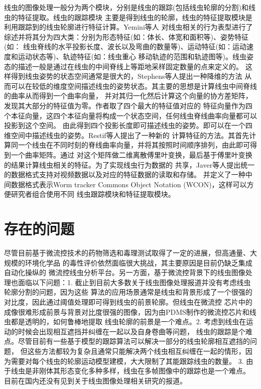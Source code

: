 	线虫的图像处理一般分为两个模块，分别是线虫的跟踪(包括线虫轮廓的分割)和线虫的特征提取。线虫的跟踪模块
	主要是得到线虫的轮廓，线虫的特征提取模块是利用跟踪到的线虫轮廓进行特征计算。Yemini等人\cite{yemini2013database}
	对线虫相关的行为表型进行了综述并将其分为四大类：分别为形态特征(如：体长、体宽和面积等)、姿势特征(如：
	线虫脊线的水平投影长度、波长以及弯曲的数量等)、运动特征(如：运动速度和运动状态等)、轨迹特征(如：线虫重心
	移动轨迹的范围和轨迹图等)。线虫姿态的描述一般是通过在线虫的中间脊线上等距地采样固定数量的点来定义的。
	这样得到线虫姿势的状态空间通常是很大的，Stephens等人\cite{Stephens2008Dimensionality}提出一种降维的方法
	从而可以在较低的维度空间描述线虫的姿势状态。其主要的思想是计算线虫中间脊线的曲率从而得到一个曲率向量，
	并对其归一化然后计算这个向量的协方差矩阵，发现其大部分的特征值为零。作者取了四个最大的特征值对应的
	特征向量作为四个本征向量，这四个本征向量将构成一个状态空间，任何线虫脊线曲率向量都可以投影到这个空间。
	由此得到四个投影长度即可描述线虫的姿势。即可以在一个四维空间中描述线虫的姿势。Restif等人\cite{Restif2014CeleST}提出了一种新的
	计算特征的方法。其首先计算同一个线虫在不同时刻的脊线曲率向量，并将其按照时间顺序排列，由此即可得到一个曲率矩阵。通过
	对这个矩阵做二维离散傅里叶变换，最后基于傅里叶变换的结果计算线虫相关的特征。为了实现线虫行为数据的
	共享，Javer等人\cite{Javer2018An}提出统一的数据格式支持对视频数据以及对应的特征数据的读取和存储。
	并定义了一种中间数据格式表示Worm tracker Commons Object Notation (WCON)，这样可以方便研究者组合使用不同
	线虫跟踪模块和特征提取模块。
\section{存在的问题}
\label{sec:intro:analog}
	 尽管目前基于微流控技术的药物筛选和毒理测试取得了一定的进展，但高通量、大规模的环境化学品
	 的毒性评价依然面临很大挑战，其主要原因是目前仍缺乏集成自动化操纵的
	 微流控线虫分析平台。另一方面，基于微流控背景下的线虫图像处理也面临以下问题：1. 截止到目前大多数关于线虫图像处理报道并没有考虑线虫轮廓分割的问题，因为这些
算法的应用场景通常是线虫和背景形成了一个很强的对比度，因此通过阈值处理即可得到线虫的前景轮廓。但线虫在微流控
芯片中的成像很难形成前景与背景对比度很强的图像，因为由PDMS制作的微流控芯片和线虫都是透明的，如何鲁棒地提取
线虫轮廓的前景是一个难点。2. 考虑到线虫在运动的时候会出现相互遮挡并纠缠在一起以及自身卷曲等问题，
线虫的跟踪是个难点。尽管目前有一些基于模型的跟踪算法可以解决一部分的线虫轮廓相互遮挡的问题，
但这些方法都较为复杂且通常只能解决两个线虫相互纠缠在一起的情形，因为需要对每个线虫的轮廓运动模型建模，大大限制了其能跟踪线虫的数量。
3. 由于线虫是非刚体其形态变化多种多样，线虫在多帧图像中的跟踪也是一个难点。
目前在国内还没有见到关于线虫图像处理相关研究的报道。

